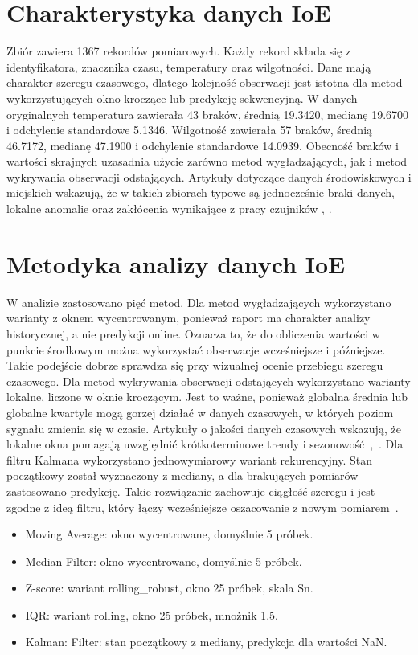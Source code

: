 \documentclass[12pt,twoside]{article}
\begin{document}
\newpage

\section{Charakterystyka danych IoE}

Zbiór zawiera 1367 rekordów pomiarowych. 
Każdy rekord składa się z identyfikatora, znacznika czasu, temperatury oraz wilgotności. 
Dane mają charakter szeregu czasowego, dlatego kolejność obserwacji jest istotna dla metod wykorzystujących okno kroczące lub predykcję sekwencyjną.
W danych oryginalnych temperatura zawierała 43 braków, średnią 19.3420, medianę 19.6700 i odchylenie standardowe 5.1346. 
Wilgotność zawierała 57 braków, średnią 46.7172, medianę 47.1900 i odchylenie standardowe 14.0939.
Obecność braków i wartości skrajnych uzasadnia użycie zarówno metod wygładzających, jak i metod wykrywania obserwacji odstających. 
Artykuły dotyczące danych środowiskowych i miejskich wskazują, że w takich zbiorach typowe są jednocześnie braki danych, lokalne anomalie oraz zakłócenia wynikające z pracy czujników \cite{bib:ioe1}, \cite{bib:ioe7}.

\section{Metodyka analizy danych IoE}

W analizie zastosowano pięć metod. 
Dla metod wygładzających wykorzystano warianty z oknem wycentrowanym, ponieważ raport ma charakter analizy historycznej, a nie predykcji online. 
Oznacza to, że do obliczenia wartości w punkcie środkowym można wykorzystać obserwacje wcześniejsze i późniejsze. 
Takie podejście dobrze sprawdza się przy wizualnej ocenie przebiegu szeregu czasowego.
Dla metod wykrywania obserwacji odstających wykorzystano warianty lokalne, liczone w oknie kroczącym. 
Jest to ważne, ponieważ globalna średnia lub globalne kwartyle mogą gorzej działać w danych czasowych, w których poziom sygnału zmienia się w czasie. 
Artykuły o jakości danych czasowych wskazują, że lokalne okna pomagają uwzględnić krótkoterminowe trendy i sezonowość~\cite{bib:ioe2},~\cite{bib:ioe7}.
Dla filtru Kalmana wykorzystano jednowymiarowy wariant rekurencyjny. 
Stan początkowy został wyznaczony z mediany, a dla brakujących pomiarów zastosowano predykcję. 
Takie rozwiązanie zachowuje ciągłość szeregu i jest zgodne z ideą filtru, który łączy wcześniejsze oszacowanie z nowym pomiarem~\cite{bib:ioe5}.
\begin{itemize}
\item{Moving Average}: okno wycentrowane, domyślnie 5 próbek.
\item{Median Filter}: okno wycentrowane, domyślnie 5 próbek.
\item{Z-score}: wariant rolling\_robust, okno 25 próbek, skala Sn.
\item{IQR}: wariant rolling, okno 25 próbek, mnożnik 1.5.
\item{Kalman}: Filter: stan początkowy z mediany, predykcja dla wartości NaN.
\end{itemize}
\end{document}
